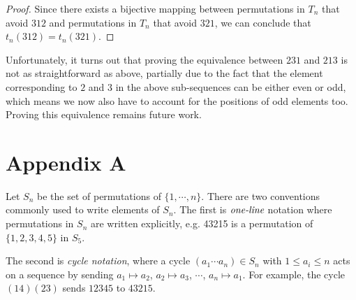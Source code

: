 \documentclass[11pt,letterpaper,twoside,english]{article}
\theoremstyle{theorem}
\theoremstyle{remark}
\begin{document}
\begin{proof}
Since there exists a bijective mapping between permutations in $T_n$ that avoid $312$ and permutations in $T_n$ that avoid $321$, we can conclude that $t_n(312) = t_n(321)$.

\end{proof}

Unfortunately, it turns out that proving the equivalence between $231$ and $213$ is not as straightforward as above, partially due to the fact that the element corresponding to $2$ and $3$ in the above sub-sequences can be either even or odd, which means we now also have to account for the positions of odd elements too. Proving this equivalence remains future work.


\section{Appendix A}

Let $S_n$ be the set of permutations of $\{1,\cdots, n\}$. There are two conventions commonly used to write elements of $S_n$. The first is $\emph{one-line}$ notation where permutations in $S_n$ are written explicitly, e.g. 43215 is a permutation of $\{1,2,3,4,5\}$ in $S_5$. 

The second is \emph{cycle notation}, where a cycle $(a_1\cdots a_n)\in S_n$ with $1\le a_i\le n$ acts on a sequence by sending $a_1\mapsto a_2$, $a_2\mapsto a_3$, $\cdots$, $a_n\mapsto a_1$. For example, the cycle $(14)(23)$ sends $12345$ to $43215$. 
\end{document}
